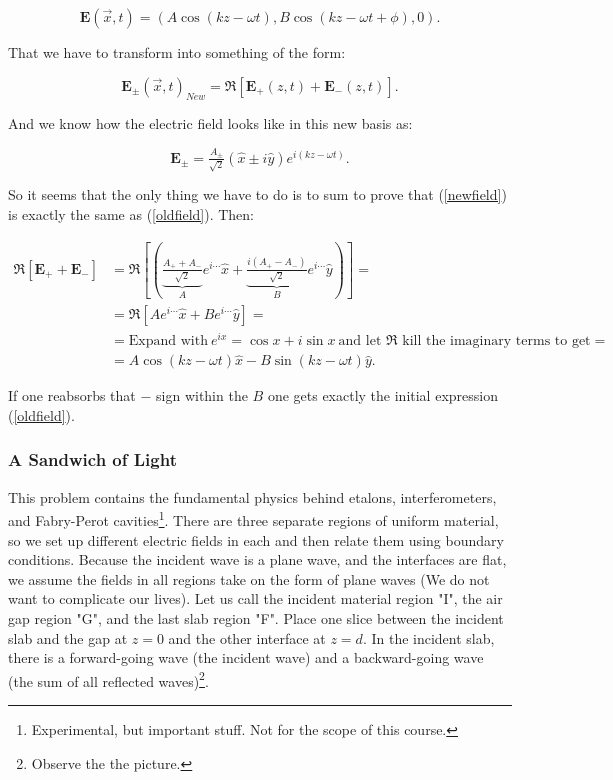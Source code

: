 \begin{equation}\label{oldfield}
	\mathbf{E}(\vec{x},t) = \left(A \cos (kz - \omega t), B \cos (kz - \omega t + \phi) , 0\right).
\end{equation}

That we have to transform into something of the form:

\begin{equation}\label{newfield}
	\mathbf{E}_{\pm}(\vec{x},t)_{New} = \Re \left[\mathbf{E}_{+}(z,t) + \mathbf{E}_{-}(z,t)\right].
\end{equation}

And we know how the electric field looks like in this new basis as:

\begin{equation}
	\mathbf{E}_{\pm} = \tfrac{A_{\pm}}{\sqrt{2}}(\hat{x}\pm i \hat{y})e^{i(kz - \omega t)}.
\end{equation}

So it seems that the only thing we have to do is to sum to prove that (\ref{newfield}) is exactly the same as (\ref{oldfield}). Then:

\begin{equation}
	\begin{split}
		\Re \left[\mathbf{E}_{+} + \mathbf{E}_{-}\right]&= \Re\left[\left(\underbrace{\tfrac{A_{+}+ A_{-}}{\sqrt{2}}}_{A} e^{i \cdots} \hat{x} + \underbrace{\tfrac{i(A_{+}- A_{-})}{\sqrt{2}}}_{B} e^{i \cdots} \hat{y}\right)\right] =\\
		&= \Re \left[A e^{i \cdots} \hat{x} + B e^{i \cdots} \hat{y} \right] =\\
		&= \text{Expand with} \: e^{i x} = \cos x + i \sin x \: \text{and let $\Re$ kill the imaginary terms to get} =\\ 
		&= A \cos (kz - \omega t)\hat{x} - B \sin (kz -\omega t)\hat{y}.
	\end{split}
\end{equation}

If one reabsorbs that $-$ sign within the $B$ one gets exactly the initial expression (\ref{oldfield}).

\subsubsection{A Sandwich of Light}\label{ASandwichofLight}

This problem contains the fundamental physics behind etalons, interferometers, and Fabry-Perot cavities\footnote{Experimental, but important stuff. Not for the scope of this course.}. There are three separate regions of uniform material, so we set up different electric fields in each and then relate them using boundary conditions. Because the incident wave is a plane wave, and the interfaces are flat, we assume the fields in all regions take on the form of plane waves (We do not want to complicate our lives). Let us call the incident material region "I", the air gap region "G", and the last slab region "F". Place one slice between the incident slab and the gap at $z=0$ and the other interface at $z=d$. In the incident slab, there is a forward-going wave (the incident wave) and a backward-going wave (the sum of all reflected waves)\footnote{Observe the the picture.}.

